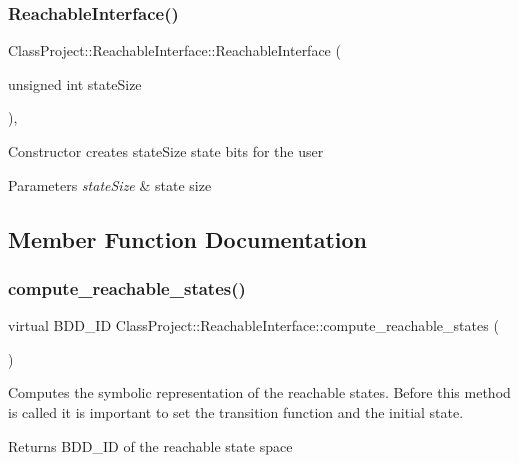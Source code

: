 \subsubsection{\texorpdfstring{Reachable\+Interface()}{ReachableInterface()}}
{\footnotesize\ttfamily Class\+Project\+::\+Reachable\+Interface\+::\+Reachable\+Interface (\begin{DoxyParamCaption}\item[{unsigned int}]{state\+Size }\end{DoxyParamCaption})\hspace{0.3cm}{\ttfamily [inline]}, {\ttfamily [explicit]}}

Constructor creates state\+Size state bits for the user 
\begin{DoxyParams}{Parameters}
{\em state\+Size} & state size \\
\hline
\end{DoxyParams}


\subsection{Member Function Documentation}
\mbox{\label{classClassProject_1_1ReachableInterface_a84a2fe53f724c184266fc22f17204499}} 
\subsubsection{\texorpdfstring{compute\+\_\+reachable\+\_\+states()}{compute\_reachable\_states()}}
{\footnotesize\ttfamily virtual B\+D\+D\+\_\+\+ID Class\+Project\+::\+Reachable\+Interface\+::compute\+\_\+reachable\+\_\+states (\begin{DoxyParamCaption}{ }\end{DoxyParamCaption})\hspace{0.3cm}{\ttfamily [pure virtual]}}

Computes the symbolic representation of the reachable states. Before this method is called it is important to set the transition function and the initial state. \begin{DoxyReturn}{Returns}
B\+D\+D\+\_\+\+ID of the reachable state space 
\end{DoxyReturn}



